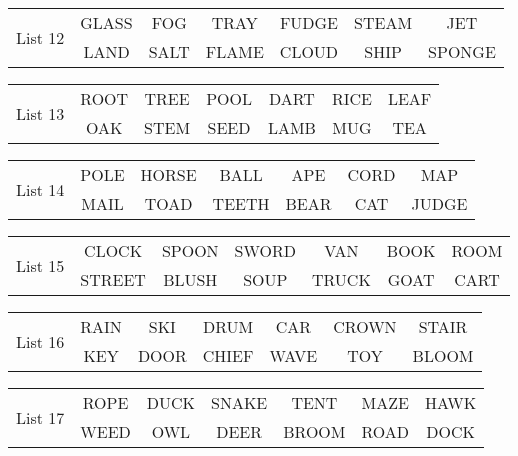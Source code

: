 \documentclass{article}
\begin{document}
\vspace{.1in}
\hspace{.5in}\begin{tabular}{r||c c c c c c }
\multirow{2}{*}{List 12} & GLASS & FOG & TRAY & FUDGE & STEAM & JET\\
\cline{2-7}			& LAND & SALT & FLAME & CLOUD & SHIP & SPONGE\\
\end{tabular}

\vspace{.1in}
\hspace{.5in}\begin{tabular}{r||c c c c c c }
\multirow{2}{*}{List 13} & ROOT & TREE & POOL & DART & RICE & LEAF\\
\cline{2-7}			& OAK & STEM & SEED & LAMB & MUG & TEA\\
\end{tabular}

\vspace{.1in}
\hspace{.5in}\begin{tabular}{r||c c c c c c }
\multirow{2}{*}{List 14} & POLE & HORSE & BALL & APE & CORD & MAP\\
\cline{2-7}			& MAIL & TOAD & TEETH & BEAR & CAT & JUDGE\\
\end{tabular}

\vspace{.1in}
\hspace{.5in}\begin{tabular}{r||c c c c c c }
\multirow{2}{*}{List 15} & CLOCK & SPOON & SWORD & VAN & BOOK & ROOM\\
\cline{2-7}			& STREET & BLUSH & SOUP & TRUCK & GOAT & CART\\
\end{tabular}

\vspace{.1in}
\hspace{.5in}\begin{tabular}{r||c c c c c c }
\multirow{2}{*}{List 16} & RAIN & SKI & DRUM & CAR & CROWN & STAIR\\
\cline{2-7}			& KEY & DOOR & CHIEF & WAVE & TOY & BLOOM\\
\end{tabular}

\vspace{.1in}
\hspace{.5in}\begin{tabular}{r||c c c c c c }
\multirow{2}{*}{List 17} & ROPE & DUCK & SNAKE & TENT & MAZE & HAWK\\
\cline{2-7}			& WEED & OWL & DEER & BROOM & ROAD & DOCK\\
\end{tabular}
\end{document}
